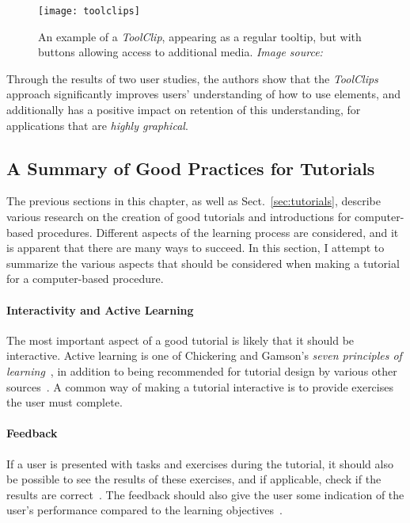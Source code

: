 \begin{figure}[htp]
	\centering
	\texttt{[image: toolclips]}
	\caption[\emph{ToolClips} example]{An example of a \emph{ToolClip}, appearing as a regular tooltip, but with buttons allowing access to additional media. \emph{Image source:~\cite{grossman:toolclips}}}
	\label{fig:toolclips}
\end{figure}

\noindent
Through the results of two user studies, the authors show that the \emph{ToolClips} approach significantly improves users' understanding of how to use elements, and additionally has a positive impact on retention of this understanding, for applications that are \emph{highly graphical}.

\subsection{A Summary of Good Practices for Tutorials}
\label{sec:good_practices_tutorials}
The previous sections in this chapter, as well as Sect.~\ref{sec:tutorials}, describe various research on the creation of good tutorials and introductions for computer-based procedures. Different aspects of the learning process are considered, and it is apparent that there are many ways to succeed. In this section, I attempt to summarize the various aspects that should be considered when making a tutorial for a computer-based procedure.

\paragraph{Interactivity and Active Learning} The most important aspect of a good tutorial is likely that it should be interactive. Active learning is one of Chickering and Gamson's \emph{seven principles of learning}~\cite{chickering:seven_principles}, in addition to being recommended for tutorial design by various other sources~\cite{bowerman:tutorial_design, aberson:tutorial_evaluation}. A common way of making a tutorial interactive is to provide exercises the user must complete.

\paragraph{Feedback} If a user is presented with tasks and exercises during the tutorial, it should also be possible to see the results of these exercises, and if applicable, check if the results are correct~\cite{chickering:seven_principles}. The feedback should also give the user some indication of the user's performance compared to the learning objectives~\cite{bowerman:tutorial_design}.

